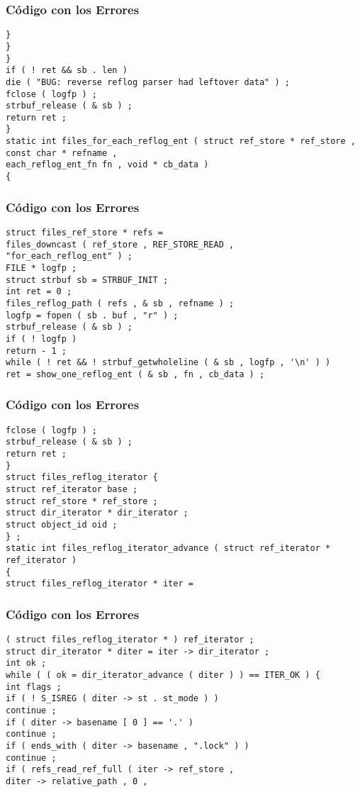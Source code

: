 \documentclass{beamer}
\begin{document}
\begin{frame}[fragile]
\frametitle{C\'odigo con los Errores}
\begin{verbatim}
} 
} 
} 
if ( ! ret && sb . len ) 
die ( "BUG: reverse reflog parser had leftover data" ) ; 
fclose ( logfp ) ; 
strbuf_release ( & sb ) ; 
return ret ; 
} 
static int files_for_each_reflog_ent ( struct ref_store * ref_store , 
const char * refname , 
each_reflog_ent_fn fn , void * cb_data ) 
{ 
\end{verbatim}
\end{frame}
\begin{frame}[fragile]
\frametitle{C\'odigo con los Errores}
\begin{verbatim}
struct files_ref_store * refs = 
files_downcast ( ref_store , REF_STORE_READ , 
"for_each_reflog_ent" ) ; 
FILE * logfp ; 
struct strbuf sb = STRBUF_INIT ; 
int ret = 0 ; 
files_reflog_path ( refs , & sb , refname ) ; 
logfp = fopen ( sb . buf , "r" ) ; 
strbuf_release ( & sb ) ; 
if ( ! logfp ) 
return - 1 ; 
while ( ! ret && ! strbuf_getwholeline ( & sb , logfp , '\n' ) ) 
ret = show_one_reflog_ent ( & sb , fn , cb_data ) ; 
\end{verbatim}
\end{frame}
\begin{frame}[fragile]
\frametitle{C\'odigo con los Errores}
\begin{verbatim}
fclose ( logfp ) ; 
strbuf_release ( & sb ) ; 
return ret ; 
} 
struct files_reflog_iterator { 
struct ref_iterator base ; 
struct ref_store * ref_store ; 
struct dir_iterator * dir_iterator ; 
struct object_id oid ; 
} ; 
static int files_reflog_iterator_advance ( struct ref_iterator * ref_iterator ) 
{ 
struct files_reflog_iterator * iter = 
\end{verbatim}
\end{frame}
\begin{frame}[fragile]
\frametitle{C\'odigo con los Errores}
\begin{verbatim}
( struct files_reflog_iterator * ) ref_iterator ; 
struct dir_iterator * diter = iter -> dir_iterator ; 
int ok ; 
while ( ( ok = dir_iterator_advance ( diter ) ) == ITER_OK ) { 
int flags ; 
if ( ! S_ISREG ( diter -> st . st_mode ) ) 
continue ; 
if ( diter -> basename [ 0 ] == '.' ) 
continue ; 
if ( ends_with ( diter -> basename , ".lock" ) ) 
continue ; 
if ( refs_read_ref_full ( iter -> ref_store , 
diter -> relative_path , 0 , 
\end{verbatim}
\end{frame}
\end{document}
